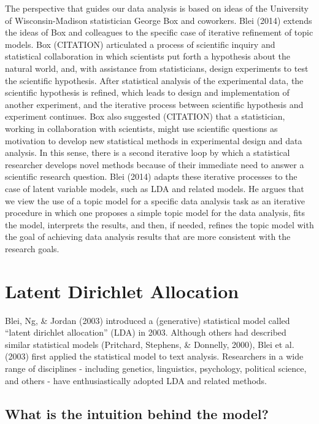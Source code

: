 \documentclass[12pt,]{article}
\begin{document}
The perspective that guides our data analysis is based on ideas of the
University of Wisconsin-Madison statistician George Box and coworkers.
Blei (2014) extends the ideas of Box and colleagues to the specific case
of iterative refinement of topic models. Box (CITATION) articulated a
process of scientific inquiry and statistical collaboration in which
scientists put forth a hypothesis about the natural world, and, with
assistance from statisticians, design experiments to test the scientific
hypothesis. After statistical analysis of the experimental data, the
scientific hypothesis is refined, which leads to design and
implementation of another experiment, and the iterative process between
scientific hypothesis and experiment continues. Box also suggested
(CITATION) that a statistician, working in collaboration with
scientists, might use scientific questions as motivation to develop new
statistical methods in experimental design and data analysis. In this
sense, there is a second iterative loop by which a statistical
researcher develops novel methods because of their immediate need to
answer a scientific research question. Blei (2014) adapts these
iterative processes to the case of latent variable models, such as LDA
and related models. He argues that we view the use of a topic model for
a specific data analysis task as an iterative procedure in which one
proposes a simple topic model for the data analysis, fits the model,
interprets the results, and then, if needed, refines the topic model
with the goal of achieving data analysis results that are more
consistent with the research goals.

\section{Latent Dirichlet Allocation}\label{latent-dirichlet-allocation}

Blei, Ng, \& Jordan (2003) introduced a (generative) statistical model
called ``latent dirichlet allocation'' (LDA) in 2003. Although others
had described similar statistical models (Pritchard, Stephens, \&
Donnelly, 2000), Blei et al. (2003) first applied the statistical model
to text analysis. Researchers in a wide range of disciplines - including
genetics, linguistics, psychology, political science, and others - have
enthusiastically adopted LDA and related methods.

\subsection{What is the intuition behind the
model?}\label{what-is-the-intuition-behind-the-model}
\end{document}
